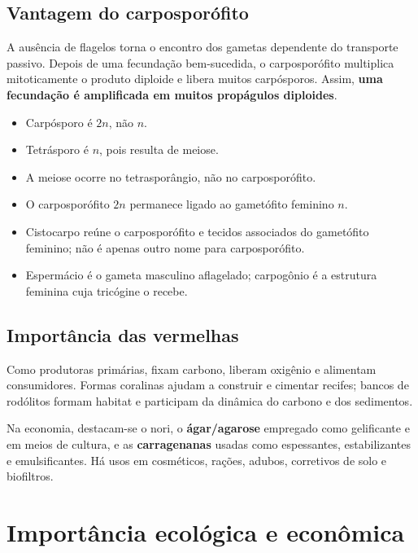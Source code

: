 \documentclass[12pt,a4paper]{article}
\newcommand{\n}{\ensuremath{n}}
\newcommand{\dn}{\ensuremath{2n}}
\begin{document}
\subsection{Vantagem do carposporófito}
A ausência de flagelos torna o encontro dos gametas dependente do transporte
passivo. Depois de uma fecundação bem-sucedida, o carposporófito multiplica
mitoticamente o produto diploide e libera muitos carpósporos. Assim,
\textbf{uma fecundação é amplificada em muitos propágulos diploides}.

\begin{cuidado}[title={Erros clássicos no ciclo das vermelhas}]
\begin{itemize}
\item Carpósporo é \dn, não \n.
\item Tetrásporo é \n, pois resulta de meiose.
\item A meiose ocorre no tetrasporângio, não no carposporófito.
\item O carposporófito \dn{} permanece ligado ao gametófito feminino \n.
\item Cistocarpo reúne o carposporófito e tecidos associados do gametófito
feminino; não é apenas outro nome para carposporófito.
\item Espermácio é o gameta masculino aflagelado; carpogônio é a estrutura
feminina cuja tricógine o recebe.
\end{itemize}
\end{cuidado}

\subsection{Importância das vermelhas}
Como produtoras primárias, fixam carbono, liberam oxigênio e alimentam
consumidores. Formas coralinas ajudam a construir e cimentar recifes; bancos de
rodólitos formam habitat e participam da dinâmica do carbono e dos sedimentos.

Na economia, destacam-se o nori, o \textbf{ágar/agarose} empregado como
gelificante e em meios de cultura, e as \textbf{carragenanas} usadas como
espessantes, estabilizantes e emulsificantes. Há usos em cosméticos, rações,
adubos, corretivos de solo e biofiltros.

\section{Importância ecológica e econômica}
\end{document}
